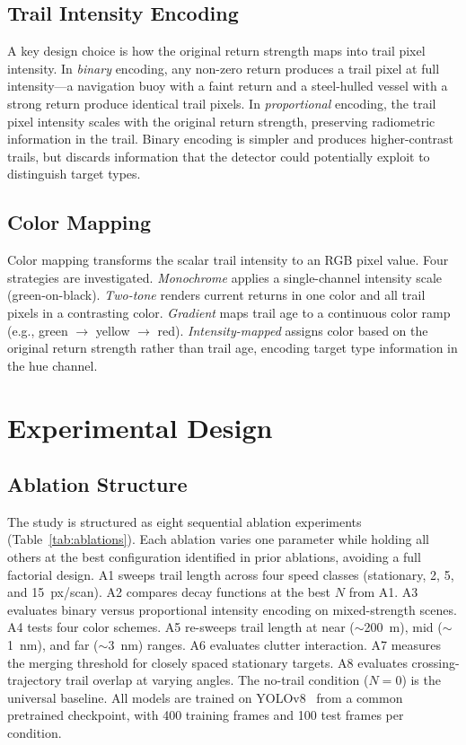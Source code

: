 \documentclass[colorlinks,upint,balance]{asmeconf}
\begin{document}
\subsection{Trail Intensity Encoding}

A key design choice is how the original return strength maps into trail pixel intensity. In \textit{binary} encoding, any non-zero return produces a trail pixel at full intensity---a navigation buoy with a faint return and a steel-hulled vessel with a strong return produce identical trail pixels. In \textit{proportional} encoding, the trail pixel intensity scales with the original return strength, preserving radiometric information in the trail. Binary encoding is simpler and produces higher-contrast trails, but discards information that the detector could potentially exploit to distinguish target types.

\subsection{Color Mapping}

Color mapping transforms the scalar trail intensity to an RGB pixel value. Four strategies are investigated. \textit{Monochrome} applies a single-channel intensity scale (green-on-black). \textit{Two-tone} renders current returns in one color and all trail pixels in a contrasting color. \textit{Gradient} maps trail age to a continuous color ramp (e.g., green $\rightarrow$ yellow $\rightarrow$ red). \textit{Intensity-mapped} assigns color based on the original return strength rather than trail age, encoding target type information in the hue channel.


\section{Experimental Design}

\subsection{Ablation Structure}

The study is structured as eight sequential ablation experiments (Table~\ref{tab:ablations}). Each ablation varies one parameter while holding all others at the best configuration identified in prior ablations, avoiding a full factorial design. A1 sweeps trail length across four speed classes (stationary, 2, 5, and 15~px/scan). A2 compares decay functions at the best $N$ from A1. A3 evaluates binary versus proportional intensity encoding on mixed-strength scenes. A4 tests four color schemes. A5 re-sweeps trail length at near ($\sim$200~m), mid ($\sim$1~nm), and far ($\sim$3~nm) ranges. A6 evaluates clutter interaction. A7 measures the merging threshold for closely spaced stationary targets. A8 evaluates crossing-trajectory trail overlap at varying angles. The no-trail condition ($N=0$) is the universal baseline. All models are trained on YOLOv8~\cite{Jocher2023YOLOv8} from a common pretrained checkpoint, with 400 training frames and 100 test frames per condition.
\end{document}
